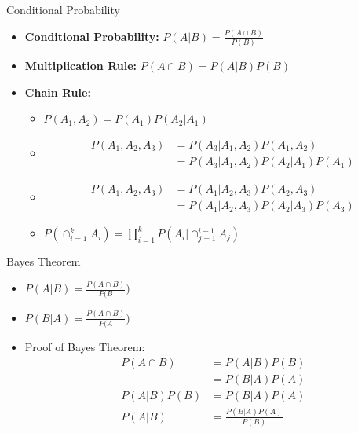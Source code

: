 \documentclass{beamer}
\begin{document}
\begin{frame}{Conditional Probability}
    \begin{itemize}
        \item {\bf Conditional Probability:} $P(A|B) = \frac{P(A \cap B)}{P(B)}$
        \item {\bf Multiplication Rule:} $P(A \cap B) = P(A|B) P(B)$
        \item {\bf Chain Rule:}
            \begin{itemize}
                \item $P(A_1, A_2) = P(A_1) P(A_2|A_1)$
                \item 
                    \begin{align*}
                        P(A_1, A_2, A_3) &= P(A_3|A_1,A_2) P(A_1,A_2) \\ 
                                         &= P(A_3|A_1,A_2) P(A_2|A_1) P(A_1)
                    \end{align*}
                \item 
                    \begin{align*}
                        P(A_1, A_2, A_3) &= P(A_1|A_2,A_3) P(A_2,A_3) \\
                                         &= P(A_1|A_2,A_3) P(A_2|A_3) P(A_3)
                    \end{align*}
                \item $P\left(\cap_{i=1}^{k} A_i \right) = \prod_{i=1}^{k} P\left( A_i | \cap_{j=1}^{i-1} A_j \right)$
            \end{itemize}
    \end{itemize}
\end{frame}

\begin{frame}{Bayes Theorem}
    \begin{itemize}
        \item $P(A|B) = \frac{P(A \cap B)}{P(B})$
        \item $P(B|A) = \frac{P(A \cap B)}{P(A})$
        \item Proof of Bayes Theorem:
            \begin{align*}
                P(A \cap B) &= P(A|B) P(B) \\ 
                            &= P(B|A) P(A) \\
                P(A|B) P(B) &= P(B|A) P(A) \\
                P(A|B)      &= \frac{P(B|A) P(A)}{P(B)}
            \end{align*}
    \end{itemize}
\end{frame}
\end{document}
